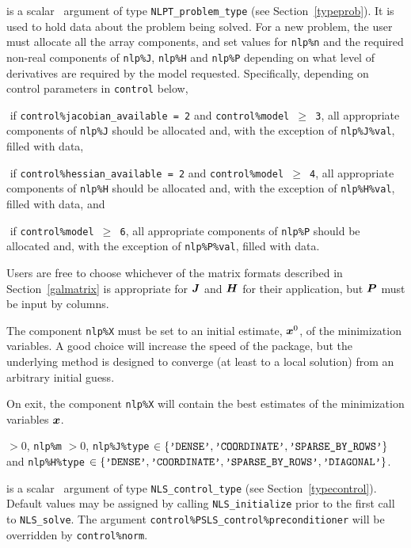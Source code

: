 \documentclass{galahad}
\newcommand{\packagename}{NLS}
\begin{document}
\vspace*{-2mm}
\begin{description}
 is a scalar \intentinout\ argument of type
{\tt NLPT\_problem\_type}
(see Section~\ref{typeprob}).
It is used to hold data about the problem being solved.
For a new problem, the user must allocate all the array components,
and set values for {\tt nlp\%n}
and the required non-real components of
{\tt nlp\%J}, {\tt nlp\%H} and {\tt nlp\%P} depending on what level
of derivatives are required by the model requested. Specifically,
depending on control parameters in {\tt control} below,
\vspace*{-2mm}
\begin{description}
\item $\mbox{}$ if {\tt control\%jacobian\_available = 2} and
{\tt control\%model $\geq$ 3}, all appropriate components of
 {\tt nlp\%J} should be allocated and, with the exception of {\tt nlp\%J\%val},
filled with data,
\item $\mbox{}$ if {\tt control\%hessian\_available = 2} and
{\tt control\%model $\geq$ 4}, all appropriate components of
 {\tt nlp\%H} should be allocated and, with the exception of {\tt nlp\%H\%val},
filled with data, and
\item $\mbox{}$ if {\tt control\%model $\geq$ 6}, all appropriate
 components of {\tt nlp\%P} should be allocated and, with the exception
 of {\tt nlp\%P\%val}, filled with data.
\end{description}
Users are free to choose whichever
of the matrix formats described in Section~\ref{galmatrix}
is appropriate for ${\bm{J}}$ and ${\bm{H}}$ for their application,
but ${\bm{P}}$ must be input by columns.

\noindent
The component {\tt nlp\%X} must be set to an initial estimate, ${\bm{x}}^{0}$,
of the minimization variables. A good choice will increase the speed
of the package, but the underlying method is designed to converge (at least
to a local solution) from an arbitrary initial guess.

\noindent
On exit, the component {\tt nlp\%X} will contain the best estimates of the
minimization variables ${\bm{x}}$.

\noindent
{} $> 0$, {\tt nlp\%m} $> 0$,
{\tt nlp\%J\%type} $\in \{
  \mbox{\tt 'DENSE'}, \mbox{\tt 'COORDINATE'}, \mbox{\tt 'SPARSE\_BY\_ROWS'}
 \}$ and
{\tt nlp\%H\%type} $\in \{
  \mbox{\tt 'DENSE'}, \mbox{\tt 'COORDINATE'}, \mbox{\tt 'SPARSE\_BY\_ROWS'},
  \mbox{\tt 'DIAGONAL'} \}$.

 is a scalar \intentin\ argument of type
{\tt \packagename\_control\_type}
(see Section~\ref{typecontrol}). Default values may be assigned by calling
{\tt \packagename\_initialize} prior to the first call to
{\tt \packagename\_solve}. The argument
{\tt control\%PSLS\_control\-\%preconditioner}
will be overridden by {\tt control\%norm}.


\end{description}
\end{document}
